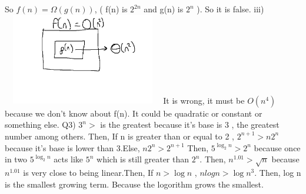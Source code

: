 \documentclass{article}
\begin{document}
So $f(n) = \Omega (g(n))$, ( f(n) is $2^{2n}$ and g(n) is $2^n$ ).
\newline
So it is false.
\newline
\newpage
iii)
\newline
\includegraphics[width=7cm, height=4cm]{x.png}
\newline
It is wrong, it must be $O(n^4)$ because we don't know about f(n). It could be quadratic or constant or something else.
\newline
\newline
Q3)
\newline
$3^n > $ is the greatest because it's base is 3 , the greatest number among others. Then,
\newline
If n is greater than or equal to 2 , $2^{n+1} > n2^n $ because it's base is lower than 3.Else, $n2^n > 2^{n+1} $ Then,
\newline
$ 5^{\log_2n} > 2^n $ because once in two $ 5^{\log_2n}$ acts like $5^n$ which is still greater than $2^n$. Then,
\newline
$n^{1.01} > \sqrt{n}$ because  $n^{1.01}$ is very close to being linear.Then,
\newline
If $ n > \log n$ , $ n log n > \log n^3$. Then,
\newline
log n is the smallest growing term. Because the logorithm grows the smallest.
\end{document}
